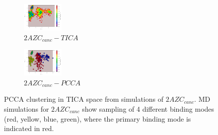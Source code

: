 \begin{figure}[!ht]
\centering
\begin{subfigure}{.5\textwidth}
  \centering
  \includegraphics[width=.9\linewidth]{chapter4/2AZC_canc/2AZC_canc-tica}
  \caption{$2AZC_{canc}-TICA$}
  \label{fig:2AZC_canc-tica}
\end{subfigure}%
\begin{subfigure}{.5\textwidth}
  \centering
  \includegraphics[width=.9\linewidth]{chapter4/2AZC_canc/2AZC_canc-pcca}
  \caption{$2AZC_{canc}-PCCA$}
  \label{fig:2AZC_canc-pcca}
\end{subfigure}
\caption[PCCA Analysis of $2AZC_{canc}$]{PCCA clustering in TICA space from simulations of $2AZC_{canc}$. MD simulations for $2AZC_{canc}$ show sampling of 4 different binding modes (red, yellow, blue, green), where the primary binding mode is indicated in red.}
\label{fig:2AZC_canc-cluster}
\end{figure}

